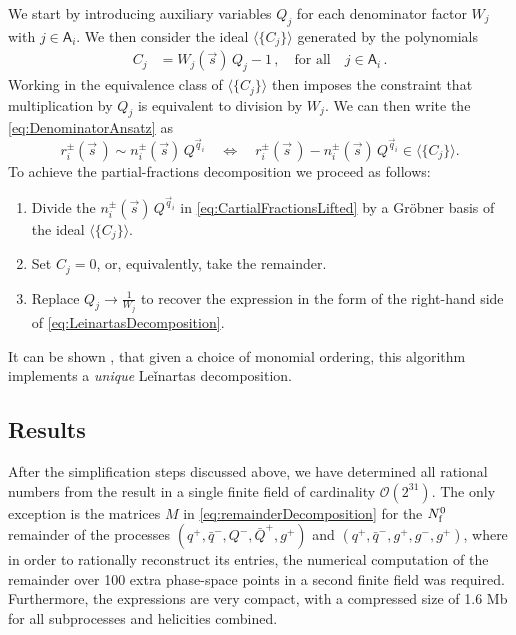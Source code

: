 We start by introducing auxiliary variables $Q_j$ for each
denominator factor $W_j$ with $j\in \mathsf{A}_{i}$.
We then consider the ideal $\langle \{C_j\} \rangle $ generated by the polynomials
\begin{align} \label{eq:PartialFractionConstraints}
    C_j &= W_j (\vec s) \, Q_j - 1\,, \quad\mbox{for all}\quad  j \in  \mathsf{A}_{i}\,.
\end{align}
Working in the equivalence class of $\langle \{C_j\} \rangle $ then imposes 
the constraint that multiplication by $Q_j$ is equivalent to division by $W_j$. 
We can then write the \cref{eq:DenominatorAnsatz} as
\begin{equation} \label{eq:CartialFractionsLifted}
    r_i^{\pm}(\vec{s}\,) \sim n_i^{\pm}(\vec s)\, Q^{\vec q_{i}} \quad\Leftrightarrow\quad r_i^{\pm}(\vec{s}\,) -  n_i^{\pm}(\vec s)\, Q^{\vec q_{i}} \in \langle \{C_j\} \rangle.
\end{equation}
To achieve the partial-fractions decomposition  we proceed as follows:
\begin{enumerate}
  \item Divide the $n_i^{\pm}(\vec s)\, Q^{\vec q_{i}}$ in \cref{eq:CartialFractionsLifted} by a Gröbner basis of the ideal $\langle \{C_j\} \rangle $.
  \item Set $C_j=0$, or, equivalently, take the remainder.
  \item Replace $Q_j\to \frac{1}{W_j}$ to recover the expression in the form of the right-hand side of \cref{eq:LeinartasDecomposition}.
\end{enumerate}
It can be shown \cite{raichev2012leinartas,Abreu:2019odu}, that given a choice of monomial ordering, this algorithm
implements a \emph{unique} Leǐnartas decomposition.

\subsection{Results}

After the simplification steps discussed above, 
we have determined all rational numbers from 
the result in a single finite field of cardinality $\mathcal{O}(2^{31})$.
The only exception is the matrices $M$ in \cref{eq:remainderDecomposition} for the $N_\mathrm{f}^0$ remainder of the processes
$( q^+, {\bar q}^-,Q^-, {\bar Q}^+, g^+ )$ and $( q^+, {\bar q}^-,g^+, g^-, g^+ )$,  where
in order to rationally reconstruct its
entries, the numerical computation of the remainder over 100 extra phase-space 
points in a second finite field was required.
Furthermore, the expressions are very compact, with a compressed size of 1.6 Mb for
all subprocesses and helicities combined.

